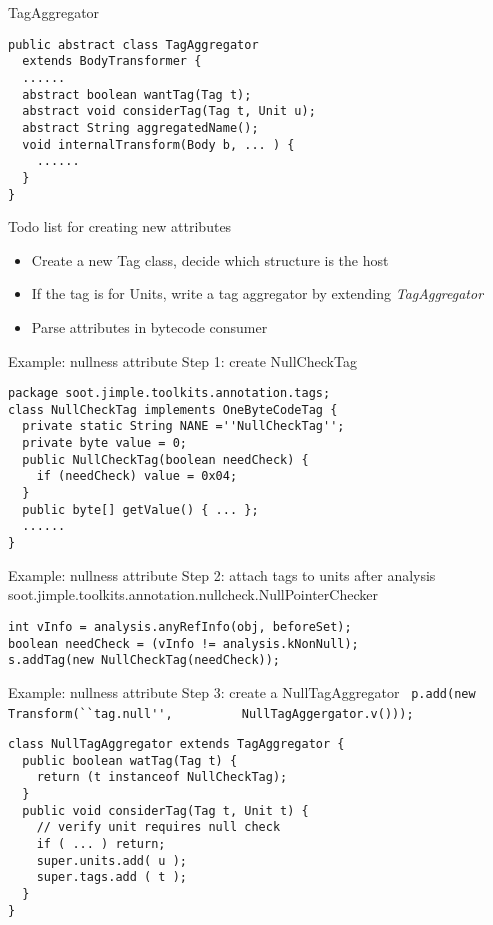 \begin{slide}{TagAggregator}
{\small
\begin{verbatim}
public abstract class TagAggregator 
  extends BodyTransformer {
  ......
  abstract boolean wantTag(Tag t);
  abstract void considerTag(Tag t, Unit u);
  abstract String aggregatedName();
  void internalTransform(Body b, ... ) { 
    ...... 
  }
}
\end{verbatim}
}
\end{slide}

\begin{slide}{Todo list for creating new attributes}
\begin{itemize}
\item Create a new Tag class, decide which structure is the host
\item If the tag is for Units, write a tag aggregator by extending {\em TagAggregator}
\item Parse attributes in bytecode consumer
\end{itemize}
\end{slide}

\begin{slide}{Example: nullness attribute}
Step 1: create NullCheckTag
\footnotesize{
\begin{verbatim}
package soot.jimple.toolkits.annotation.tags;
class NullCheckTag implements OneByteCodeTag {
  private static String NANE =''NullCheckTag'';
  private byte value = 0;
  public NullCheckTag(boolean needCheck) {
    if (needCheck) value = 0x04;
  }
  public byte[] getValue() { ... };
  ......
}
\end{verbatim}
}
\end{slide}

\begin{slide}{Example: nullness attribute}
Step 2: attach tags to units after analysis \\
{\small soot.jimple.toolkits.annotation.nullcheck.NullPointerChecker}
\footnotesize{
\begin{verbatim}
int vInfo = analysis.anyRefInfo(obj, beforeSet);
boolean needCheck = (vInfo != analysis.kNonNull); 
s.addTag(new NullCheckTag(needCheck));
\end{verbatim}
}
\end{slide}

\begin{slide}{Example: nullness attribute}
Step 3: create a NullTagAggregator
{\scriptsize \verb$ p.add(new Transform(``tag.null'',$
   \verb$         NullTagAggergator.v())); $}

{\scriptsize
\begin{verbatim}
class NullTagAggregator extends TagAggregator {
  public boolean watTag(Tag t) {
    return (t instanceof NullCheckTag);
  }
  public void considerTag(Tag t, Unit t) {
    // verify unit requires null check
    if ( ... ) return; 
    super.units.add( u );
    super.tags.add ( t );
  }
}
\end{verbatim}
}
\end{slide}

